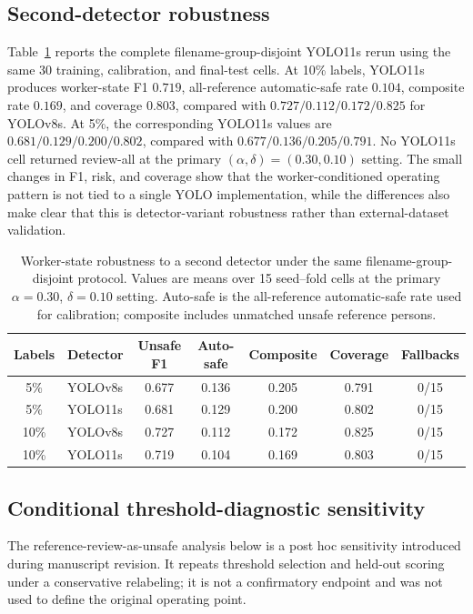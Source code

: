\documentclass[iicol,pdflatex,sn-mathphys-num]{sn-jnl}
\begin{document}
\subsection{Second-detector robustness}

Table~\ref{tab:detector_robustness} reports the complete filename-group-disjoint YOLO11s rerun using the same 30 training, calibration, and final-test cells. At 10\% labels, YOLO11s produces worker-state F1 $0.719$, all-reference automatic-safe rate $0.104$, composite rate $0.169$, and coverage $0.803$, compared with $0.727/0.112/0.172/0.825$ for YOLOv8s. At 5\%, the corresponding YOLO11s values are $0.681/0.129/0.200/0.802$, compared with $0.677/0.136/0.205/0.791$. No YOLO11s cell returned review-all at the primary $(\alpha,\delta)=(0.30,0.10)$ setting. The small changes in F1, risk, and coverage show that the worker-conditioned operating pattern is not tied to a single YOLO implementation, while the differences also make clear that this is detector-variant robustness rather than external-dataset validation.

\begin{table}[t]
\caption{Worker-state robustness to a second detector under the same filename-group-disjoint protocol. Values are means over 15 seed--fold cells at the primary $\alpha=0.30$, $\delta=0.10$ setting. Auto-safe is the all-reference automatic-safe rate used for calibration; composite includes unmatched unsafe reference persons.}
\label{tab:detector_robustness}
\centering
\scriptsize
\setlength{\tabcolsep}{5pt}
\begin{tabular}{@{}c l c c c c c@{}}
\toprule
Labels & Detector & Unsafe F1 & Auto-safe & Composite & Coverage & Fallbacks \\
\midrule
5\%  & YOLOv8s  & 0.677 & 0.136 & 0.205 & 0.791 & 0/15 \\
5\%  & YOLO11s  & 0.681 & 0.129 & 0.200 & 0.802 & 0/15 \\
10\% & YOLOv8s  & 0.727 & 0.112 & 0.172 & 0.825 & 0/15 \\
10\% & YOLO11s  & 0.719 & 0.104 & 0.169 & 0.803 & 0/15 \\
\bottomrule
\end{tabular}
\end{table}


\subsection{Conditional threshold-diagnostic sensitivity}

The reference-review-as-unsafe analysis below is a post hoc sensitivity introduced during manuscript revision. It repeats threshold selection and held-out scoring under a conservative relabeling; it is not a confirmatory endpoint and was not used to define the original operating point.
\end{document}
